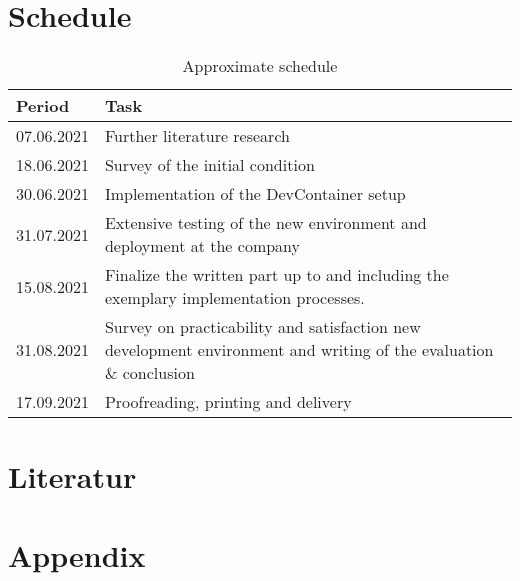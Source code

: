 \documentclass[12pt, a4paper]{article}
\begin{document}
\section{Schedule}
\begin{table}[H]
    \centering
    \begin{tabular}{ l p{14cm} }
    \hline
    Period & Task \\ \hline\hline
    07.06.2021 & Further literature research\\ \hline
    18.06.2021 & Survey of the initial condition\\ \hline
    30.06.2021 & Implementation of the DevContainer setup\\ \hline
    31.07.2021 & Extensive testing of the new environment and deployment at the company\\ \hline
    15.08.2021 & Finalize the written part up to and including the exemplary implementation processes.\\ \hline
    31.08.2021 & Survey on practicability and satisfaction new development environment and writing of the evaluation \& conclusion \\ \hline
    17.09.2021 & Proofreading, printing and delivery\\ \hline
    \end{tabular}
    \caption{Approximate schedule}
    \label{tab::time}
    \end{table}
\section{Literatur}


\newpage

\renewcommand{\thesubsection}{\Alph{subsection}}
\setcounter{page}{\value{lastroman}}
\section*{Appendix}


\end{document}

